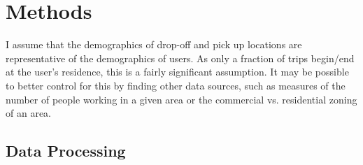 \documentclass[11pt]{article}
\begin{document}


  


\section{Methods}



I assume that the demographics of drop-off and pick up locations are representative of the demographics of users. As only a fraction of trips begin/end at the user's residence, this is a fairly significant assumption.
It may be possible to better control for this by finding other data sources, such as measures of the number of people working in a given area or the commercial vs. residential zoning of an area.

\subsection{Data Processing}
\end{document}

